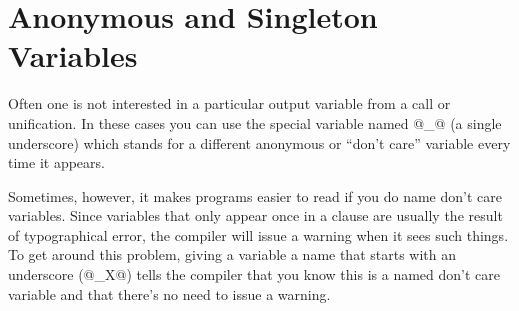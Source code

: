 
\section{Anonymous and Singleton Variables}

Often one is not interested in a particular output variable
from a call or unification.  In these cases you can use the
special variable named @_@ (a single underscore) which stands
for a different anonymous or ``don't care'' variable every time
it appears.

Sometimes, however, it makes programs easier to read if you do
name don't care variables.  Since variables that only appear
once in a clause are usually the result of typographical
error, the compiler will issue a warning when it sees such
things.  To get around this problem, giving a variable a
name that starts with an underscore (\eg @_X@) tells the compiler that
you know this is a named don't care variable and that there's
no need to issue a warning.



